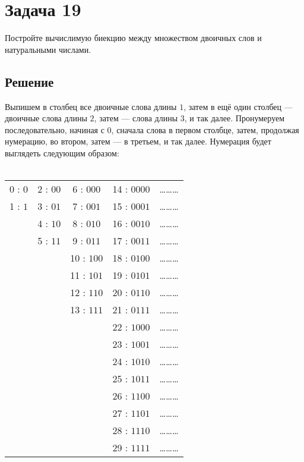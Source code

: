 \documentclass[a4paper,12pt]{article}
\begin{document}
	\section*{Задача 19}
	Постройте вычислимую биекцию между множеством двоичных слов и натуральными числами.
	\subsection*{Решение}
	Выпишем в столбец все двоичные слова длины $1$, затем в ещё один столбец --- двоичные слова длины $2$, затем --- слова длины $3$, и так далее. Пронумеруем последовательно, начиная с $0$, сначала слова в первом столбце, затем, продолжая нумерацию, во втором, затем --- в третьем, и так далее. Нумерация будет выглядеть следующим образом: \\\\
	{
	\boldmath
	\begin{tabular}{c c c c c}
	   0 : $0$  & 2 : $00$ & \phantom{1}6 : $000$ & 14 : $0000$ & \ldots\ldots\ldots\\
	   1 : $1$  & 3 : $01$ & \phantom{1}7 : $001$ & 15 : $0001$ & \ldots\ldots\ldots\\
	            & 4 : $10$ & \phantom{1}8 : $010$ & 16 : $0010$ & \ldots\ldots\ldots\\
	            & 5 : $11$ & \phantom{1}9 : $011$ & 17 : $0011$ & \ldots\ldots\ldots\\
	            &          & 10 : $100$           & 18 : $0100$ & \ldots\ldots\ldots\\
	            &          & 11 : $101$           & 19 : $0101$ & \ldots\ldots\ldots\\
	            &          & 12 : $110$           & 20 : $0110$ & \ldots\ldots\ldots\\
                &          & 13 : $111$           & 21 : $0111$ & \ldots\ldots\ldots\\
	            &          &                      & 22 : $1000$ & \ldots\ldots\ldots\\
	            &          &                      & 23 : $1001$ & \ldots\ldots\ldots\\
	            &          &                      & 24 : $1010$ & \ldots\ldots\ldots\\
	            &          &                      & 25 : $1011$ & \ldots\ldots\ldots\\
	            &          &                      & 26 : $1100$ & \ldots\ldots\ldots\\
	            &          &                      & 27 : $1101$ & \ldots\ldots\ldots\\
	            &          &                      & 28 : $1110$ & \ldots\ldots\ldots\\
	            &          &                      & 29 : $1111$ & \ldots\ldots\ldots\\
	      
	   \end{tabular}
	}
\end{document}
